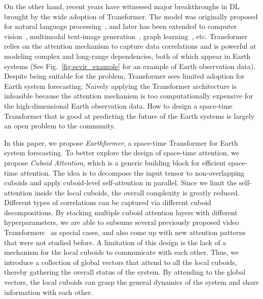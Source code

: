 \documentclass{article}
\newcommand{\figref}[1]{Fig.~\ref{#1}}
\begin{document}
On the other hand, recent years have witnessed major breakthroughs in DL brought by the wide adoption of Transformer. The model was originally proposed for natural language processing~\cite{vaswani2017attention, devlin2018bert}, and later has been extended to computer vision~\cite{dosovitskiy2020image,liu2021swin}, multimodal text-image generation~\cite{ramesh2021zero}, graph learning~\cite{ying2021transformers}, etc. 
Transformer relies on the attention mechanism to capture data correlations and is powerful at modeling complex and long-range dependencies, both of which appear in Earth systems (See \figref{fig:sevir_example} for an example of Earth observation data). 
Despite being suitable for the problem, Transformer sees limited adoption for Earth system forecasting. 
Naively applying the Transformer architecture is infeasible because the  attention mechanism is too computationally expensive for the high-dimensional Earth observation data.
How to design a space-time Transformer that is good at predicting the future of the Earth systems is largely an open problem to the community. 




In this paper, we propose \emph{Earthformer}, a space-time Transformer for Earth system forecasting. To better explore the design of space-time attention, we propose \emph{Cuboid Attention}, which is a generic building block for efficient space-time attention. The idea is to decompose the input tensor to non-overlapping cuboids and apply cuboid-level self-attention in parallel. Since we limit the  self-attention inside the local cuboids, the overall complexity is greatly reduced. Different types of correlations can be captured via different cuboid decompositions. By stacking multiple cuboid attention layers with different hyperparameters, we are able to subsume several previously proposed video Transformers~\cite{ho2019axial, liu2021video, bertasius2021space} as special cases, and also come up with new attention patterns that were not studied before. A limitation of this design is the lack of a mechanism for the local cuboids to communicate with each other. Thus, we introduce a collection of global vectors that attend to all the local cuboids, thereby gathering the overall status of the system. By attending to the global vectors, the local cuboids can grasp the general dynamics of the system and share information with each other.
\end{document}
